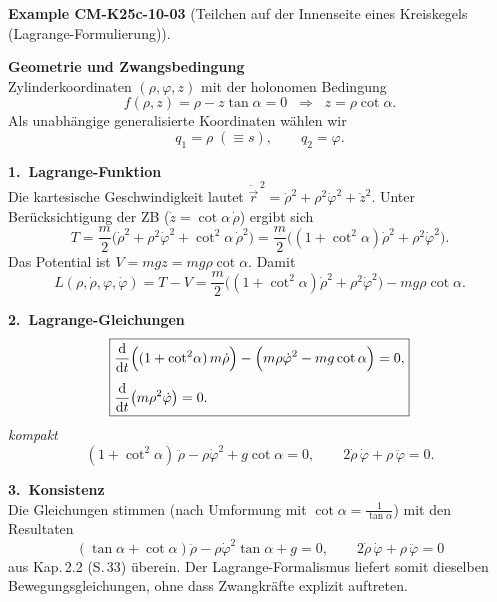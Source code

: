 \documentclass[10pt, letterpaper]{article}
\newcommand{\CustomHeading}[3]{%
  \par\medskip\noindent%
  \textbf{#1 #2} \textnormal{(#3)}.\enskip%
}
\newenvironment{EXA}[2]{\CustomHeading{Example}{#1}{#2}}{}
\begin{document}
\begin{EXA}{CM-K25c-10-03}{Teilchen auf der Innenseite eines Kreiskegels (Lagrange-Formulierung)}
\textbf{Geometrie und Zwangsbedingung}\\
Zylinderkoordinaten $(\rho,\varphi,z)$ mit der holonomen Bedingung  
\[
  f(\rho,z)=\rho-z\tan\alpha=0
  \;\;\Longrightarrow\;\;
  z=\rho\cot\alpha .
\]
Als unabhängige generalisierte Koordinaten wählen wir
\[
  q_1=\rho\;(\equiv s), 
  \qquad 
  q_2=\varphi .
\]

\textbf{1.\ Lagrange-Funktion}\\
Die kartesische Geschwindigkeit lautet
\(
  \dot{\vec r}^{\,2}=\dot\rho^{2}+\rho^{2}\dot\varphi^{2}+\dot z^{2}.
\)
Unter Berücksichtigung der ZB ($\dot z=\cot\alpha\,\dot\rho$) ergibt sich  
\[
  T=\frac{m}{2}\!\bigl(\dot\rho^{2}+\rho^{2}\dot\varphi^{2}
        +\cot^{2}\!\alpha\,\dot\rho^{2}\bigr)
    =\frac{m}{2}\!\bigl((1+\cot^{2}\!\alpha)\dot\rho^{2}
        +\rho^{2}\dot\varphi^{2}\bigr).
\]
Das Potential ist $V=m g z=m g\rho\cot\alpha$.  
Damit
\[
  L(\rho,\dot\rho,\varphi,\dot\varphi)
  =T-V
  =\frac{m}{2}\!\bigl((1+\cot^{2}\!\alpha)\dot\rho^{2}
        +\rho^{2}\dot\varphi^{2}\bigr)
   -mg\rho\cot\alpha .
\]

\textbf{2.\ Lagrange-Gleichungen}\\[-6pt]
\[
\boxed{
  \begin{aligned}
    &\frac{\mathrm d}{\mathrm dt}
       \Bigl((1+\cot^{2}\!\alpha)\,m\dot\rho\Bigr)
      -\Bigl(m\rho\dot\varphi^{2}-mg\cot\alpha\Bigr)=0,\\[4pt]
    &\frac{\mathrm d}{\mathrm dt}\bigl(m\rho^{2}\dot\varphi\bigr)=0.
  \end{aligned}}
\]
\textit{kompakt}
\[
  (1+\cot^{2}\!\alpha)\,\ddot\rho-\rho\dot\varphi^{2}
  +g\cot\alpha=0,
  \qquad
  2\dot\rho\,\dot\varphi+\rho\,\ddot\varphi=0.
\]

\textbf{3.\ Konsistenz}\\
Die Gleichungen stimmen (nach Umformung mit  
$\cot\alpha=\tfrac{1}{\tan\alpha}$) mit den Resultaten 
\[
  (\tan\alpha+\cot\alpha)\ddot\rho-\rho\dot\varphi^{2}\tan\alpha+g=0,
  \qquad
  2\dot\rho\,\dot\varphi+\rho\,\ddot\varphi=0
\]
aus Kap.\,2.2 (S.\,33) überein.  
Der Lagrange-Formalismus liefert somit dieselben Bewegungsgleichungen, 
ohne dass Zwangkräfte explizit auftreten.
\end{EXA}
\end{document}
